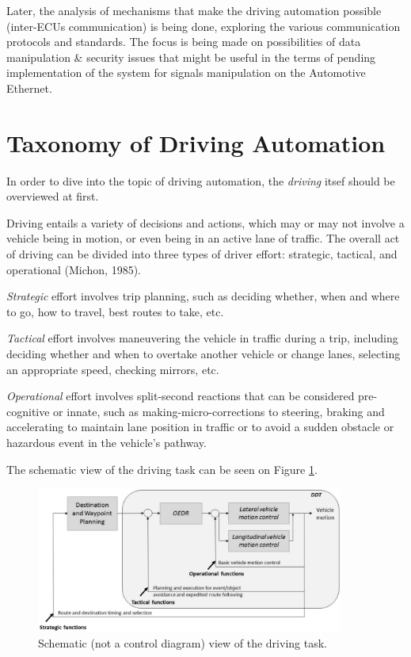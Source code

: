 Later, the analysis of mechanisms that make the driving automation possible (inter-ECUs communication) is being done, exploring the various communication protocols and standards.
The focus is being made on possibilities of data manipulation \& security issues that might be useful in the terms of pending implementation of the system for signals manipulation on the Automotive Ethernet.

\section{Taxonomy of Driving Automation}
In order to dive into the topic of driving automation, the \textit{driving} itsef should be overviewed at first.

Driving entails a variety of decisions and actions, which may or may not involve a vehicle being in motion, or even being in an active lane of traffic. 
The overall act of driving can be divided into three types of driver effort: strategic, tactical, and operational (Michon, 1985).

\textit{Strategic} effort involves trip planning, such as deciding whether, when and where to go, how to travel, best routes to take, etc.

\textit{Tactical} effort involves maneuvering the vehicle in traffic during a trip, including deciding whether and when to overtake another vehicle or change lanes, selecting an appropriate speed, checking mirrors, etc.

\textit{Operational} effort involves split-second reactions that can be considered pre-cognitive or innate, such as making-micro-corrections to steering, braking and accelerating to maintain lane position in traffic or to avoid a sudden obstacle or hazardous event in the vehicle’s pathway.

The schematic view of the driving task can be seen on Figure \ref{fig:driving_task}.

\begin{figure}[h]
  \centering
  \includegraphics[width=0.9\textwidth]{images/ddt_explained.PNG}
  \caption{Schematic (not a control diagram) view of the driving task.}
  \label{fig:driving_task}
\end{figure}

